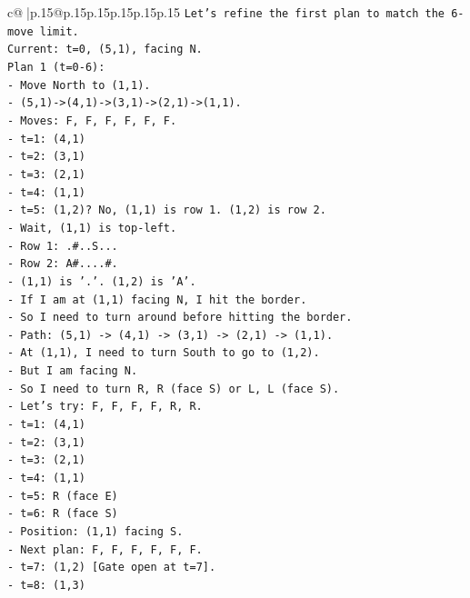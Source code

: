 \documentclass{article}
\begin{document}
{\begin{supertabular}{c@{$\;$}|p{.15\linewidth}@{}p{.15\linewidth}p{.15\linewidth}p{.15\linewidth}p{.15\linewidth}p{.15\linewidth}}
{{{\texttt{Let's refine the first plan to match the 6{-}move limit.} \\
\texttt{Current: t=0, (5,1), facing N.} \\
\texttt{Plan 1 (t=0{-}6):} \\
\texttt{{-} Move North to (1,1).} \\
\texttt{{-} (5,1){-}>(4,1){-}>(3,1){-}>(2,1){-}>(1,1).} \\
\texttt{{-} Moves: F, F, F, F, F, F.} \\
\texttt{{-} t=1: (4,1)} \\
\texttt{{-} t=2: (3,1)} \\
\texttt{{-} t=3: (2,1)} \\
\texttt{{-} t=4: (1,1)} \\
\texttt{{-} t=5: (1,2)? No, (1,1) is row 1. (1,2) is row 2.} \\
\texttt{{-} Wait, (1,1) is top{-}left.} \\
\texttt{{-} Row 1: .\#..S...} \\
\texttt{{-} Row 2: A\#....\#.} \\
\texttt{{-} (1,1) is '.'. (1,2) is 'A'.} \\
\texttt{{-} If I am at (1,1) facing N, I hit the border.} \\
\texttt{{-} So I need to turn around before hitting the border.} \\
\texttt{{-} Path: (5,1) {-}> (4,1) {-}> (3,1) {-}> (2,1) {-}> (1,1).} \\
\texttt{{-} At (1,1), I need to turn South to go to (1,2).} \\
\texttt{{-} But I am facing N.} \\
\texttt{{-} So I need to turn R, R (face S) or L, L (face S).} \\
\texttt{{-} Let's try: F, F, F, F, R, R.} \\
\texttt{{-} t=1: (4,1)} \\
\texttt{{-} t=2: (3,1)} \\
\texttt{{-} t=3: (2,1)} \\
\texttt{{-} t=4: (1,1)} \\
\texttt{{-} t=5: R (face E)} \\
\texttt{{-} t=6: R (face S)} \\
\texttt{{-} Position: (1,1) facing S.} \\
\texttt{{-} Next plan: F, F, F, F, F, F.} \\
\texttt{{-} t=7: (1,2) {[}Gate open at t=7{]}.} \\
\texttt{{-} t=8: (1,3)} \\
}}}
\end{supertabular}}
\end{document}
